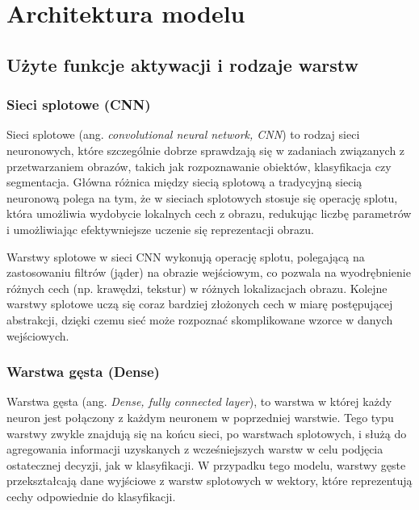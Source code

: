 \section{Architektura modelu}\label{sec:architektura-modelu}

\subsection{Użyte funkcje aktywacji i rodzaje warstw}\label{subsec:uzyte-funkcje-aktywacji-i-rodzaje-warstw}

\subsubsection{Sieci splotowe (CNN)~\cite{Goodfellow-et-al-2016}}
Sieci splotowe (ang. \textit{convolutional neural network, CNN}) to rodzaj sieci neuronowych, które szczególnie dobrze sprawdzają się w zadaniach związanych
z przetwarzaniem obrazów, takich jak rozpoznawanie obiektów, klasyfikacja czy segmentacja.
Główna różnica między siecią splotową a tradycyjną siecią neuronową polega na tym,
że w sieciach splotowych stosuje się operację splotu, która umożliwia wydobycie lokalnych cech z obrazu,
redukując liczbę parametrów i umożliwiając efektywniejsze uczenie się reprezentacji obrazu.

Warstwy splotowe w sieci CNN wykonują operację splotu, polegającą na zastosowaniu filtrów (jąder) na obrazie wejściowym,
co pozwala na wyodrębnienie różnych cech (np. krawędzi, tekstur) w różnych lokalizacjach obrazu.
Kolejne warstwy splotowe uczą się coraz bardziej złożonych cech w miarę postępującej abstrakcji,
dzięki czemu sieć może rozpoznać skomplikowane wzorce w danych wejściowych.

\subsubsection{Warstwa gęsta (Dense)~\cite{Goodfellow-et-al-2016}}
Warstwa gęsta (ang. \textit{Dense, fully connected layer}), to warstwa w której każdy neuron jest połączony z każdym neuronem w poprzedniej warstwie.
Tego typu warstwy zwykle znajdują się na końcu sieci, po warstwach splotowych, i służą do agregowania informacji uzyskanych
z wcześniejszych warstw w celu podjęcia ostatecznej decyzji, jak w klasyfikacji.
W przypadku tego modelu, warstwy gęste przekształcają dane wyjściowe z warstw splotowych w wektory,
które reprezentują cechy odpowiednie do klasyfikacji.


